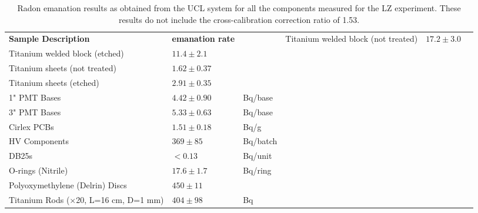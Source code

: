\begin{table}[h!]
\centering
\caption{Radon emanation results as obtained from the UCL system for all the components measured for the LZ experiment. These results do not include the cross-calibration correction ratio of 1.53.}
\label{tab:ucl_emanation_results}
\vspace{1mm}
\renewcommand{\arraystretch}{1.2}
    \begin{tabularx}{1\linewidth}{@{\extracolsep{\fill}}lll}
    \toprule
    \textbf{Sample Description} & %
    \textbf{\RnTTT{} emanation rate} & %
    \textbf{} & %
    \hline
    \hline
    Titanium welded block (not treated) & $17.2\pm3.0$  & \mBqms{} \\
    Titanium welded block (etched)      & $11.4\pm2.1$  & \mBqms{} \\
    Titanium sheets (not treated)       & $1.62\pm0.37$ & \mBqms{} \\
    Titanium sheets (etched)            & $2.91\pm0.35$ & \mBqms{} \\  
    1" PMT Bases                        & $4.42\pm0.90$ & \micro{}Bq/base \\ 
    3" PMT Bases                        & $5.33\pm0.63$ & \micro{}Bq/base \\ 
    Cirlex PCBs                         & $1.51\pm0.18$ & \micro{}Bq/g \\ 
    HV Components                       & $369\pm85$    & \micro{}Bq/batch \\ 
    DB25s                               & $<0.13$    & \micro{}Bq/unit \\ 
    O-rings (Nitrile)                   & $17.6\pm1.7$    & \micro{}Bq/ring \\ 
    Polyoxymethylene (Delrin) Discs     & $450\pm11$    & \uBqms{} \\ 
    Titanium Rods ($\times$20, L=16 cm, D=1 mm)    & $404\pm98$    & \micro{}Bq \\ 
    \bottomrule
    \end{tabularx}
\end{table}